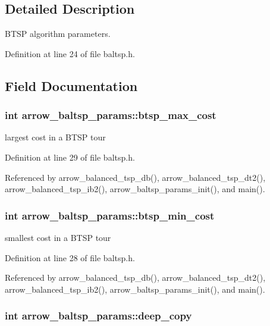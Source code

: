 \subsection{Detailed Description}
BTSP algorithm parameters. 

Definition at line 24 of file baltsp.h.

\subsection{Field Documentation}
\hypertarget{structarrow__baltsp__params_b21fe0ed58f267896e5fe0569a4ed7fa}{
\subsubsection[{btsp\_\-max\_\-cost}]{\setlength{\rightskip}{0pt plus 5cm}int {\bf arrow\_\-baltsp\_\-params::btsp\_\-max\_\-cost}}}
\label{structarrow__baltsp__params_b21fe0ed58f267896e5fe0569a4ed7fa}


largest cost in a BTSP tour 

Definition at line 29 of file baltsp.h.

Referenced by arrow\_\-balanced\_\-tsp\_\-db(), arrow\_\-balanced\_\-tsp\_\-dt2(), arrow\_\-balanced\_\-tsp\_\-ib2(), arrow\_\-baltsp\_\-params\_\-init(), and main().\hypertarget{structarrow__baltsp__params_81da2be762548a7f677f69266b0293eb}{
\subsubsection[{btsp\_\-min\_\-cost}]{\setlength{\rightskip}{0pt plus 5cm}int {\bf arrow\_\-baltsp\_\-params::btsp\_\-min\_\-cost}}}
\label{structarrow__baltsp__params_81da2be762548a7f677f69266b0293eb}


smallest cost in a BTSP tour 

Definition at line 28 of file baltsp.h.

Referenced by arrow\_\-balanced\_\-tsp\_\-db(), arrow\_\-balanced\_\-tsp\_\-dt2(), arrow\_\-balanced\_\-tsp\_\-ib2(), arrow\_\-baltsp\_\-params\_\-init(), and main().\hypertarget{structarrow__baltsp__params_b7de31c488ac81bafec9c2eface46e1e}{
\subsubsection[{deep\_\-copy}]{\setlength{\rightskip}{0pt plus 5cm}int {\bf arrow\_\-baltsp\_\-params::deep\_\-copy}}}
\label{structarrow__baltsp__params_b7de31c488ac81bafec9c2eface46e1e}





